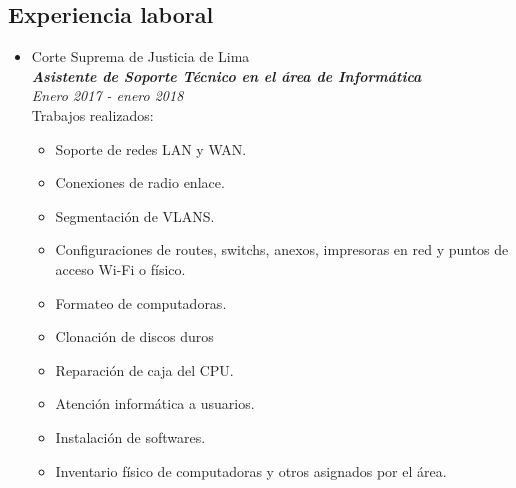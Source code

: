 \documentclass[11pt, oneside, a4paper, titlepage]{article}
\begin{document}
\begin{tcolorbox}
\begin{minipage}[t]{11cm}
\begin{tcolorbox}[grow to right by=0.75cm, colframe=white, colback=white]
				\section*{Experiencia laboral}
				\begin{itemize}
					\item Corte Suprema de Justicia de Lima\\
					\emph{\textbf{Asistente de Soporte Técnico en el área de Informática}}\\
					\emph{Enero 2017 - enero 2018}\\
					{Trabajos realizados:}
					\begin{itemize}
						\item Soporte de redes LAN y WAN.
						\item Conexiones de radio enlace.
						\item Segmentación de VLANS.
						\item Configuraciones de routes, switchs, anexos, impresoras en red y puntos de acceso Wi-Fi o físico.
						\item Formateo de computadoras. 
						\item Clonación de discos duros
						\item Reparación de caja del CPU.
						\item Atención informática a usuarios.
						\item Instalación de softwares.
						\item Inventario físico de computadoras y otros asignados por el área.
						
					\end{itemize}
				\end{itemize}
			\end{tcolorbox}
		\end{minipage}
	\end{tcolorbox}
	
\end{document}
